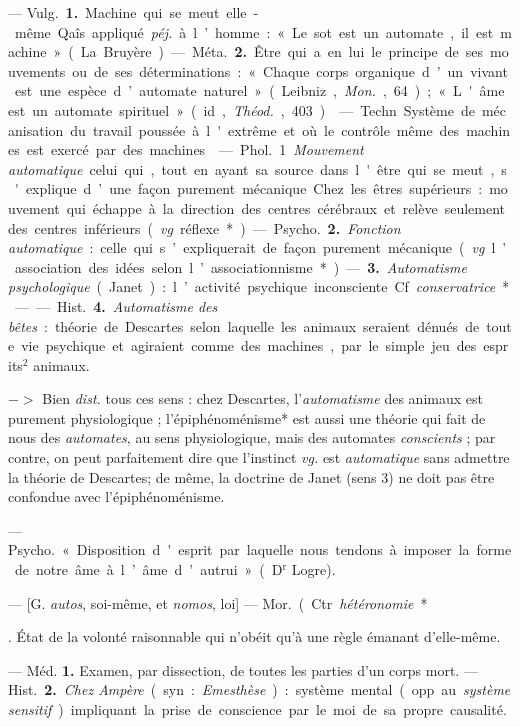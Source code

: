 \begin{itemize}[leftmargin=1cm, label=, itemsep=1pt]
{ — \si{Vulg.} {\bf 1.} Machine qui se
meut elle-même. Qaîs. appliqué {\it péj.}
à l’homme : « Le sot est un automate,
il est machine » (La Bruyère).

— \si{Méta.} {\bf 2.} Être qui a en lui le
principe de ses mouvements ou de
ses déterminations : « Chaque corps
organique d’un vivant est une espèce
d’automate naturel » (Leibniz, {\it Mon.},
64); « L'âme est un automate spirituel » (id., {\it Théod.}, 403).

 — Techn. Système de
mécanisation du travail poussée à
l'extrême et où le contrôle même
des machines est exercé par des
machines.

 — \si{Phol.} 1 {\it Mouvement
automatique} celui qui, tout en
ayant sa source dans l'être qui se
meut, s'explique d’une façon purement mécanique. Chez les êtres
supérieurs : mouvement qui échappe
à la direction des centres cérébraux
et relève seulement des centres inférieurs ({\it vg}. réflexe*).

— \si{Psycho.} {\bf 2.} {\it Fonction automatique} : celle qui s’expliquerait de
façon purement mécanique ({\it vg}. l’association des idées selon
l’associationnisme*). — {\bf 3.} {\it Automatisme psychologique} (Janet) :
l’activité psychique inconsciente. Cf. {\it conservatrice}*.

—— \si{Hist.} {\bf 4.} {\it Automatisme des bêtes} :
théorie de Descartes selon laquelle
les animaux seraient dénués de toute
vie psychique et agiraient comme
des machines, par le simple jeu des
esprits$^2$ animaux.

$->$ Bien {\it dist.} tous ces sens :
chez Descartes, l’{\it automatisme} des
animaux est purement physiologique ; l’épiphénoménisme* est aussi
une théorie qui fait de nous des
{\it automates}, au sens physiologique,
mais des automates {\it conscients} ; par
contre, on peut parfaitement dire
que l'instinct {\it vg.} est {\it automatique}
sans admettre la théorie de Descartes; de même, la doctrine de
Janet (sens 3) ne doit pas être confondue avec l’épiphénoménisme.

 — \si{Psycho.} « Disposition d'esprit par laquelle nous
tendons à imposer la forme de notre
âme à l’âme d’autrui » (D$^\text{r}$ Logre).

 — [G. {\it autos}, soi-même, et
{\it nomos}, loi] — \si{Mor.} (Ctr. {\it hétéronomie}*}. État de la volonté
raisonnable qui n’obéit qu'à une règle
émanant d’elle-même.

 — Méd. {\bf 1.} Examen, par dissection, de toutes les parties d’un
corps mort. — \si{Hist.} {\bf 2.} {\it Chez Ampère}
(syn. : {\it Emesthèse}) : système mental
(opp. au {\it système sensitif}) impliquant
la prise de conscience par le moi de
sa propre causalité.


\end{itemize}
